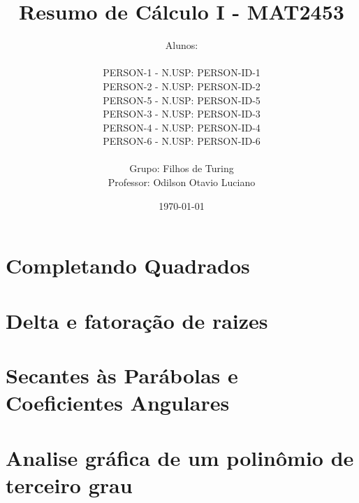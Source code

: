 \documentclass[12pt, a4paper]{article}
\title{
	Resumo de Cálculo I - MAT2453
}
\author{
	Alunos:
	\\  
	\\ {{PERSON-1}} - N.USP: {{PERSON-ID-1}}
	\\ {{PERSON-2}} - N.USP: {{PERSON-ID-2}}
	\\ {{PERSON-5}} - N.USP: {{PERSON-ID-5}}
	\\ {{PERSON-3}} - N.USP: {{PERSON-ID-3}}
	\\ {{PERSON-4}} - N.USP: {{PERSON-ID-4}}
	\\ {{PERSON-6}} - N.USP: {{PERSON-ID-6}}
	\\ \\
	Grupo: Filhos de Turing
	\\ Professor: Odilson Otavio Luciano
}
\date{\today}
\begin{document}
	\maketitle
	\thispagestyle{empty}
	\newpage

	\tableofcontents
	
	\newpage

	\section{Completando Quadrados}

	
	\newpage

	\section{Delta e fatoração de raizes}

	
	\newpage

	\section{Secantes às Parábolas e Coeficientes Angulares}

	
	\newpage

	\section{Analise gráfica de um polinômio de terceiro grau}

	
\end{document}
